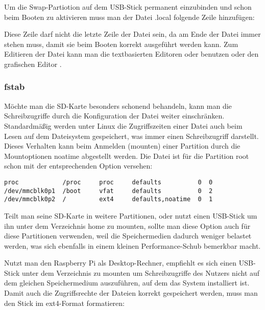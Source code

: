 
Um die Swap-Partiotion auf dem USB-Stick permanent einzubinden und schon beim Booten zu aktivieren muss man der Datei .local folgende Zeile hinzufügen:


Diese Zeile darf nicht die letzte Zeile der Datei sein, da am Ende der Datei immer  stehen muss, damit sie beim Booten korrekt ausgeführt werden kann. Zum Editieren der Datei kann man die textbasierten Editoren  oder  benutzen oder den grafischen Editor .

\subsubsection{fstab}

Möchte man die SD-Karte besonders schonend behandeln, kann man die Schreibzugriffe durch die Konfiguration der Datei  weiter einschränken. Standardmäßig werden unter Linux die Zugriffszeiten einer Datei auch beim Lesen auf dem Dateisystem gespeichert, was immer einen Schreibzugriff darstellt. Dieses Verhalten kann beim Anmelden (mounten) einer Partition durch die Mountoptionen noatime abgestellt werden. Die Datei  ist für die Partition root schon mit der entsprechenden Option versehen:

\begin{lstlisting}
proc            /proc     proc     defaults          0  0
/dev/mmcblk0p1  /boot     vfat     defaults          0  2
/dev/mmcblk0p2  /         ext4     defaults,noatime  0  1
\end{lstlisting}

Teilt man seine SD-Karte in weitere Partitionen, oder nutzt einen USB-Stick um ihn unter dem Verzeichnis home zu mounten, sollte man diese Option auch für diese Partitionen verwenden, weil die Speichermedien dadurch weniger belastet werden, was sich ebenfalls in einem kleinen Performance-Schub bemerkbar macht.

Nutzt man den Raspberry Pi als Desktop-Rechner, empfiehlt es sich einen USB-Stick unter dem Verzeichnis  zu mounten um Schreibzugriffe des Nutzers nicht auf dem gleichen Speichermedium auszuführen, auf dem das System installiert ist. Damit auch die Zugriffsrechte der Dateien korrekt gespeichert werden, muss man den Stick im ext4-Format formatieren:


